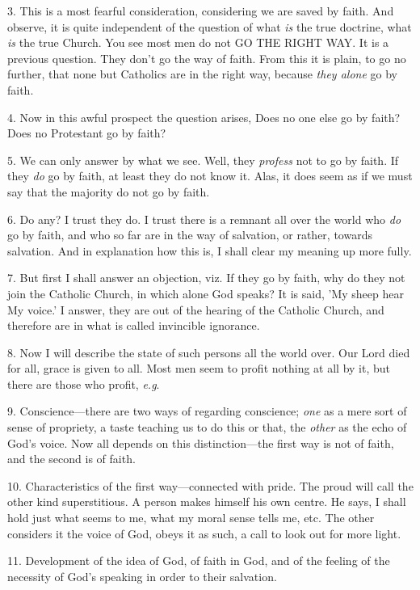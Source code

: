3. This is a most fearful consideration,
considering we are saved by faith. And observe, it is quite
independent of the question of what \emph{is} the true doctrine, what \emph{is}
the true Church. You see most men do not GO
THE RIGHT WAY. It is a previous question. They don't go the way
of faith. From this it is plain, to go no further, that none but
Catholics are in the right way, because \emph{they alone} go by faith.

4. Now in this awful prospect the question
arises, Does no one else go by faith? Does no Protestant go by faith?

5. We can only answer by what we see. Well, they \emph{profess}
not to go by faith. If they \emph{do} go by faith, at least they do
not know it. Alas, it does seem as if we must say that the majority do
not go by faith.

6. Do any? I trust they do. I trust there is a
remnant all over the world who \emph{do} go by faith, and who so far
are in the way of salvation, or rather, towards salvation. And in
explanation how this is, I shall clear my meaning up more fully.

7. But first I shall answer an objection, viz. If
they go by faith, why do they not join the Catholic Church, in which
alone God speaks? It is said, 'My sheep hear My voice.' I answer, they
are out of the hearing of the Catholic Church, and therefore are in
what is called invincible ignorance.

8. Now I will describe the state of such persons
all the world over. Our Lord died for all, grace is given to all. Most
men seem to profit nothing at all by it, but there are those who
profit, \emph{e.g}.

9. Conscience—there are two ways of regarding
conscience; \emph{one} as a mere sort of sense of propriety, a taste
teaching us to do this or that, the \emph{other} as the echo of God's
voice. Now all depends on this distinction—the first way is not of
faith, and the second is of faith.

10. Characteristics of the first way—connected
with pride. The proud will call the other kind superstitious. A person
makes himself his own centre. He says, I shall hold just what seems to
me, what my moral sense tells me, etc. The other considers it the
voice of God, obeys it as such, a call to look out for more light.

11. Development of the idea of God, of faith in
God, and of the feeling of the necessity of God's speaking in order to
their salvation.

